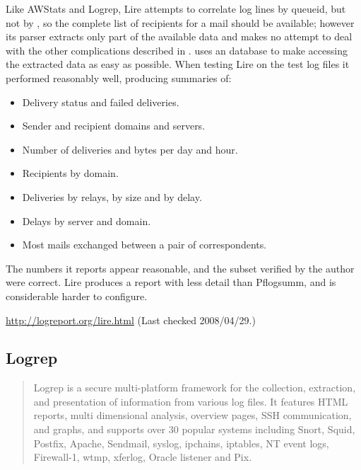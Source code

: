 Like AWStats and Logrep, Lire attempts to correlate log lines by queueid,
but not by \pid{}, so the complete list of recipients for a mail should be
available; however its parser extracts only part of the available data and
makes no attempt to deal with the other complications described in
 .
\parsername{} uses an \SQL{} database to make accessing the extracted data
as easy as possible.  When testing Lire on the \numberOFlogFILES{} test log
files it performed reasonably well, producing summaries of: 

\begin{itemize}

    \item Delivery status and failed deliveries.

    \item Sender and recipient domains and servers.

    \item Number of deliveries and bytes per day and hour.

    \item Recipients by domain.

    \item Deliveries by relays, by size and by delay.

    \item Delays by server and domain.

    \item Most mails exchanged between a pair of correspondents.

\end{itemize}

The numbers it reports appear reasonable, and the subset verified by the
author were correct.  Lire produces a report with less detail than
Pflogsumm, and is considerable harder to configure.

\url{http://logreport.org/lire.html} \newline (Last checked 2008/04/29.)

\subsection{Logrep}

\begin{quotation}

    Logrep is a secure multi-platform framework for the collection,
    extraction, and presentation of information from various log files. It
    features HTML reports, multi dimensional analysis, overview pages, SSH
    communication, and graphs, and supports over 30 popular systems
    including Snort, Squid, Postfix, Apache, Sendmail, syslog, ipchains,
    iptables, NT event logs, Firewall-1, wtmp, xferlog, Oracle listener and
    Pix.

\end{quotation}

